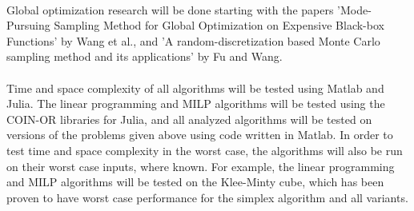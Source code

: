 \documentclass[11pt]{article}
\begin{document}
	\paragraph*{}Global optimization research will be done starting with the papers 'Mode-Pursuing Sampling Method for Global Optimization on
	Expensive Black-box Functions' by Wang et al.\cite{mps}, and 'A random-discretization based Monte Carlo sampling
	method and its applications' by Fu and Wang.\cite{montecarlo}
	\paragraph*{}Time and space complexity of all algorithms will be tested using Matlab and Julia. The linear programming and MILP algorithms will be tested using the COIN-OR libraries for Julia, and all analyzed algorithms will be tested on versions of the problems given above using code written in Matlab. In order to test time and space complexity in the worst case, the algorithms will also be run on their worst case inputs, where known. For example, the linear programming and MILP algorithms will be tested on the Klee-Minty cube, which has been proven to have worst case performance for the simplex algorithm and all variants\cite{KleeMinty}. 
	
	
	
\end{document}
